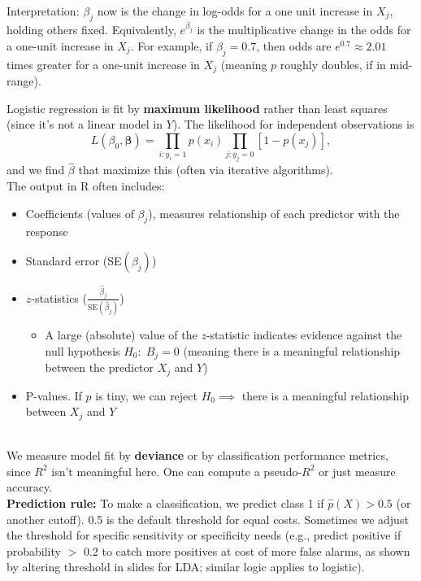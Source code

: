 \documentclass[11pt]{article}
\begin{document}
\noindent Interpretation: $\beta_j$ now is the change in log-odds for a one unit increase in $X_j$, holding others fixed. Equivalently, $e^{\beta_j}$ is the multiplicative change in the odds for a one-unit increase in $X_j$. For example, if $\beta_j = 0.7$, then odds are $e^{0.7}\approx2.01$ times greater for a one-unit increase in $X_j$ (meaning $p$ roughly doubles, if in mid-range).

\noindent Logistic regression is fit by \textbf{maximum likelihood} rather than least squares (since it's not a linear model in $Y$). The likelihood for independent observations is 
\[ L(\beta_0,\boldsymbol{\beta}) = \prod_{i: y_i=1} p(x_i) \prod_{j: y_j=0} [1-p(x_j)], \]
and we find $\hat\beta$ that maximize this (often via iterative algorithms).  \\

\noindent The output in R often includes:
\begin{itemize}
    \item Coefficients (values of $\beta_j$), measures relationship of each predictor with the response
    \item Standard error (SE$(\beta_j)$)
    \item $z$-statistics ($\frac{\hat{\beta}_j}{\text{SE}(\hat{\beta}_j)}$)
    \begin{itemize}
        \item A large (absolute) value of the $z$-statistic indicates evidence against the null hypothesis $H_0: \; B_j = 0$ (meaning there is a meaningful relationship between the predictor $X_j$ and $Y$)
    \end{itemize}
    \item P-values. If $p$ is tiny, we can reject $H_0 \implies$ there is a meaningful relationship between $X_j$ and $Y$
\end{itemize} 
\phantom{i}
\\ \noindent We measure model fit by \textbf{deviance} or by classification performance metrics, since $R^2$ isn't meaningful here. One can compute a pseudo-$R^2$ or just measure accuracy. \\

\noindent \textbf{Prediction rule:} To make a classification, we predict class 1 if $\hat p(X) > 0.5$ (or another cutoff). 0.5 is the default threshold for equal costs. Sometimes we adjust the threshold for specific sensitivity or specificity needs (e.g., predict positive if probability $>$ 0.2 to catch more positives at cost of more false alarms, as shown by altering threshold in slides for LDA; similar logic applies to logistic). \\
\end{document}
